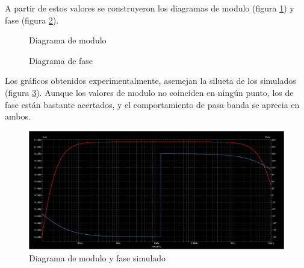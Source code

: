 \documentclass[12pt,letterpaper]{article}     %
\begin{document}
{A partir de estos valores se construyeron los diagramas de modulo 
(figura \ref{fig:DiagramDeModulo})
y fase (figura \ref{fig:DiagramDeFase}).

\begin{figure}[!ht]
	\begin{center}
	\end{center}
\caption{Diagrama de modulo}
\label{fig:DiagramDeModulo}
\end{figure}

\begin{figure}[!ht]
	\begin{center}
	\end{center}
\caption{Diagrama de fase}
\label{fig:DiagramDeFase}
\end{figure}

Los gráficos obtenidos experimentalmente, asemejan la silueta de los simulados (figura \ref{fig:ModuloYFase}).
Aunque los valores de modulo no coinciden en ningún punto, los de fase están
bastante acertados, y el comportamiento de pasa banda se aprecia en ambos.

\begin{figure}[!ht]
\centering
\includegraphics[scale=0.3]{imagenes/ModuloYFase.png}
\caption{Diagrama de modulo y fase simulado}
\label{fig:ModuloYFase}
\end{figure}

}
\end{document}
